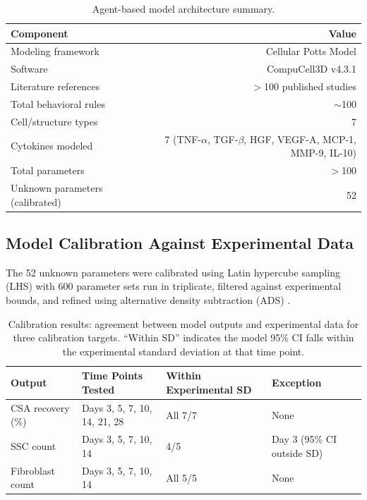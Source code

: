 \documentclass[11pt]{article}
\begin{document}
\begin{table}[H]
\centering
\caption{Agent-based model architecture summary.}
\label{tab:architecture}
\begin{tabular}{lr}
\toprule
\textbf{Component} & \textbf{Value} \\
\midrule
Modeling framework & Cellular Potts Model \\
Software & CompuCell3D v4.3.1 \\
Literature references & $>$100 published studies \\
Total behavioral rules & $\sim$100 \\
Cell/structure types & 7 \\
Cytokines modeled & 7 (TNF-$\alpha$, TGF-$\beta$, HGF, VEGF-A, MCP-1, MMP-9, IL-10) \\
Total parameters & $>$100 \\
Unknown parameters (calibrated) & 52 \\
\bottomrule
\end{tabular}
\end{table}

\subsection{Model Calibration Against Experimental Data}

The 52 unknown parameters were calibrated using Latin hypercube sampling (LHS) with 600 parameter sets run in triplicate, filtered against experimental bounds, and refined using alternative density subtraction (ADS) \citep{mckay1979comparison, marino2008methodology}.

\begin{table}[H]
\centering
\caption{Calibration results: agreement between model outputs and experimental data for three calibration targets. ``Within SD'' indicates the model 95\% CI falls within the experimental standard deviation at that time point.}
\label{tab:calibration}
\begin{tabular}{llll}
\toprule
\textbf{Output} & \textbf{Time Points Tested} & \textbf{Within Experimental SD} & \textbf{Exception} \\
\midrule
CSA recovery (\%) & Days 3, 5, 7, 10, 14, 21, 28 & All 7/7 & None \\
SSC count & Days 3, 5, 7, 10, 14 & 4/5 & Day 3 (95\% CI outside SD) \\
Fibroblast count & Days 3, 5, 7, 10, 14 & All 5/5 & None \\
\bottomrule
\end{tabular}
\end{table}
\end{document}
